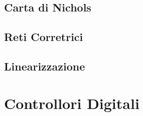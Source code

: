 \documentclass{article}
\numberwithin{equation}{subsection}
\begin{document}
\subsection{Carta di Nichols}

\subsection{Reti Corretrici}

\subsection{Linearizzazione}

\clearpage

\section{Controllori Digitali}
\end{document}
